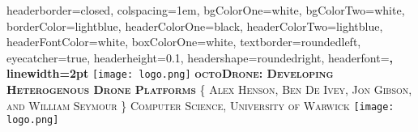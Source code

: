 \documentclass[landscape,a0paper,fontscale=0.285]{baposter} %
\begin{document}
\begin{poster}
{
headerborder=closed, %
colspacing=1em, %
bgColorOne=white, %
bgColorTwo=white, %
borderColor=lightblue, %
headerColorOne=black, %
headerColorTwo=lightblue, %
headerFontColor=white, %
boxColorOne=white, %
textborder=roundedleft, %
eyecatcher=true, %
headerheight=0.1\textheight, %
headershape=roundedright, %
headerfont=\Large\bf\textsc, %
linewidth=2pt %
}
%
{\texttt{[image: logo.png]}} %
{\bf\textsc{octoDrone: Developing Heterogenous Drone Platforms}\vspace{0.5em}} %
{\textsc{\{ Alex Henson, Ben De Ivey, Jon Gibson, and William Seymour \} \hspace{12pt} Computer Science, University of Warwick}} %
{\texttt{[image: logo.png]}} %


\end{poster}
\end{document}
